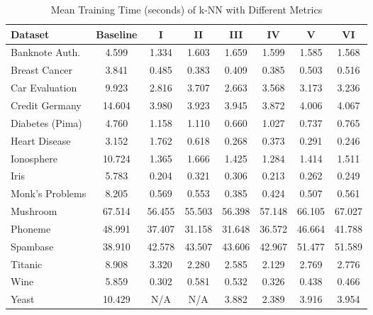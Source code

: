 \documentclass[conference]{IEEEtran}
\begin{document}
\begin{table*}[htbp]
\caption{Mean Training Time (seconds) of k-NN with Different Metrics}
\label{tab:training_time_results}
\begin{center}
\begin{tabular}{|l|c|c|c|c|c|c|c|}
\hline
\textbf{Dataset} & \textbf{Baseline} & \textbf{I} & \textbf{II} & \textbf{III} & \textbf{IV} & \textbf{V} & \textbf{VI} \\
\hline
Banknote Auth. & 4.599 & 1.334 & 1.603 & 1.659 & 1.599 & 1.585 & 1.568 \\
Breast Cancer & 3.841 & 0.485 & 0.383 & 0.409 & 0.385 & 0.503 & 0.516 \\
Car Evaluation & 9.923 & 2.816 & 3.707 & 2.663 & 3.568 & 3.173 & 3.236 \\
Credit Germany & 14.604 & 3.980 & 3.923 & 3.945 & 3.872 & 4.006 & 4.067 \\
Diabetes (Pima) & 4.760 & 1.158 & 1.110 & 0.660 & 1.027 & 0.737 & 0.765 \\
Heart Disease & 3.152 & 1.762 & 0.618 & 0.268 & 0.373 & 0.291 & 0.246 \\
Ionosphere & 10.724 & 1.365 & 1.666 & 1.425 & 1.284 & 1.414 & 1.511 \\
Iris & 5.783 & 0.204 & 0.321 & 0.306 & 0.213 & 0.262 & 0.249 \\
Monk's Problems & 8.205 & 0.569 & 0.553 & 0.385 & 0.424 & 0.507 & 0.561 \\
Mushroom & 67.514 & 56.455 & 55.503 & 56.398 & 57.148 & 66.105 & 67.027 \\
Phoneme & 48.991 & 37.407 & 31.158 & 31.648 & 36.572 & 46.664 & 41.788 \\
Spambase & 38.910 & 42.578 & 43.507 & 43.606 & 42.967 & 51.477 & 51.589 \\
Titanic & 8.908 & 3.320 & 2.280 & 2.585 & 2.129 & 2.769 & 2.776 \\
Wine & 5.859 & 0.302 & 0.581 & 0.532 & 0.326 & 0.438 & 0.466 \\
Yeast & 10.429 & N/A & N/A & 3.882 & 2.389 & 3.916 & 3.954 \\
\hline
\end{tabular}
\end{center}
\end{table*}
\end{document}
